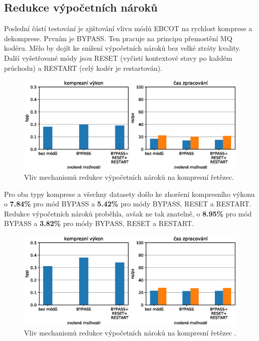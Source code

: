 %
%
\newpage
\subsection*{Redukce výpočetních nároků}
Poslední částí testování je zjištování vlivu módů EBCOT na rychlost komprese a dekomprese. Prvním je BYPASS. Ten pracuje na principu přemostění MQ kodéru. Mělo by dojít ke snížení výpočetních nároků bez velké ztráty kvality. Další vyšetřované módy jsou RESET (vyčistí kontextové stavy po každém průchodu) a RESTART (celý kodér je restartován).

\begin{figure}[hbt!]
  \centering
  \hspace*{-0.75cm}
  \includegraphics[width=16cm]{obrazky-figures/compute/test.eps}
  \caption{Vliv mechanismů redukce výpočetních nároků na kompresní řetězec.}
\end{figure}

Pro oba typy komprese a všechny datasety došlo ke zhoršení kompresního výkonu o \textbf{7.84\%} pro mód BYPASS a \textbf{5.42\%} pro módy BYPASS, RESET a RESTART. Redukce výpočetních nároků proběhla, avšak ne tak znatelně, o \textbf{8.95\%} pro mód BYPASS a \textbf{3.82\%} pro módy BYPASS, RESET a RESTART.

\begin{figure}[hbt!]
  \centering
  \hspace*{-0.75cm}
  \includegraphics[width=16cm]{obrazky-figures/compute/test2.eps}
  \caption{Vliv mechanismů redukce výpočetních nároků na kompresní řetězec .}
\end{figure}

